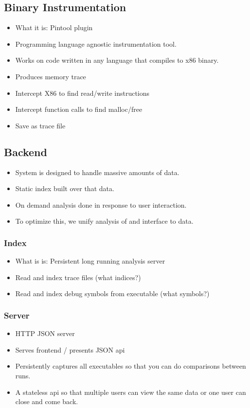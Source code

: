 \documentclass[annual]{acmsiggraph}
\begin{document}
  \subsection{Binary Instrumentation}
    \begin{itemize}
      \item What it is: Pintool plugin
      \item Programming language agnostic instrumentation tool.
      \item Works on code written in any language that compiles to x86 binary.
      \item Produces memory trace
      \item Intercept X86 to find read/write instructions
      \item Intercept function calls to find malloc/free
      \item Save as trace file
    \end{itemize}
  \subsection{Backend}
    \begin{itemize}
      \item System is designed to handle massive amounts of data.
      \item Static index built over that data.
      \item On demand analysis done in response to user interaction.
      \item To optimize this, we unify analysis of and interface to data.
    \end{itemize}


    \subsubsection{Index}
      \begin{itemize}
        \item What is is: Persistent long running analysis server
        \item Read and index trace files (what indices?)
        \item Read and index debug symbols from executable (what symbols?)
      \end{itemize}
      

    \subsubsection{Server}
      \begin{itemize}
        \item HTTP JSON server
        \item Serves frontend / presents JSON api
        \item Persistently captures all executables so that you can do comparisons between runs.
        \item A stateless api so that multiple users can view the same data or one user can close and come back.
      \end{itemize}
\end{document}
